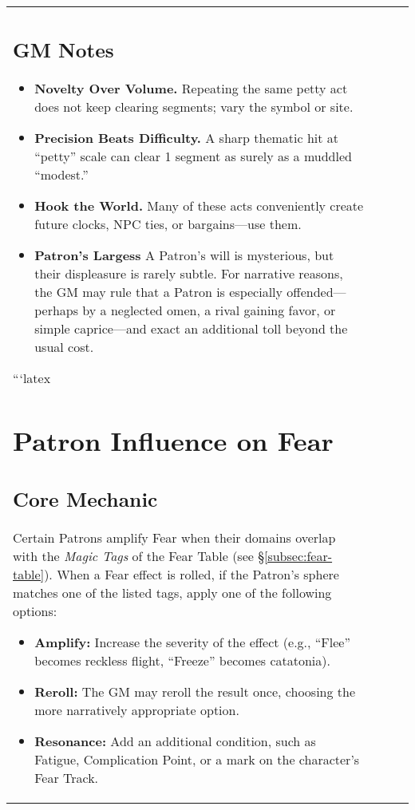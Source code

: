 \begin{longtable}{@{}p{3.3cm}p{3.3cm}p{4.6cm}p{7.2cm}@{}}
\subsection*{GM Notes}\label{subsec:acts-service-gm}
\begin{itemize}
\item \textbf{Novelty Over Volume.} Repeating the same petty act does not keep clearing segments; vary the symbol or site.
\item \textbf{Precision Beats Difficulty.} A sharp thematic hit at “petty” scale can clear 1 segment as surely as a muddled “modest.”
\item \textbf{Hook the World.} Many of these acts conveniently create future clocks, NPC ties, or bargains—use them.
\item \textbf{Patron’s Largess} A Patron’s will is mysterious, but their displeasure is rarely subtle. For narrative reasons, the GM may rule that a Patron is especially offended—perhaps by a neglected omen, a rival gaining favor, or simple caprice—and exact an additional toll beyond the usual cost.
\end{itemize}

```latex
\section{Patron Influence on Fear}
\label{sec:patron-fear-influence}

\subsection{Core Mechanic}
\label{subsec:patron-fear-core}

Certain Patrons amplify Fear when their domains overlap with the \emph{Magic Tags} of the Fear Table (see \S\ref{subsec:fear-table}).  
When a Fear effect is rolled, if the Patron's sphere matches one of the listed tags, apply one of the following options:

\begin{itemize}
  \item \textbf{Amplify:} Increase the severity of the effect (e.g., ``Flee'' becomes reckless flight, ``Freeze'' becomes catatonia).
  \item \textbf{Reroll:} The GM may reroll the result once, choosing the more narratively appropriate option.
  \item \textbf{Resonance:} Add an additional condition, such as Fatigue, Complication Point, or a mark on the character's Fear Track.
\end{itemize}

\end{longtable}
